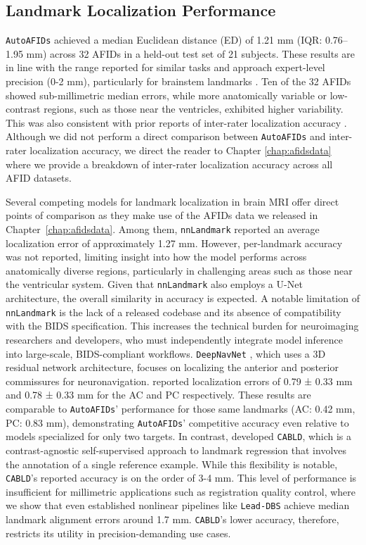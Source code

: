 \subsection{Landmark Localization Performance}

\texttt{AutoAFIDs} achieved a median Euclidean distance (ED) of 1.21 mm (IQR: 0.76–1.95 mm) across 32 AFIDs in a held-out test set of 21 subjects. These results are in line with the range reported for similar tasks \cite{Ertl2025-wu, Salari2024-iu, Edwards2021-su} and approach expert-level precision (0-2 mm), particularly for brainstem landmarks \cite{Abbass2022-lf}. Ten of the 32 AFIDs showed sub-millimetric median errors, while more anatomically variable or low-contrast regions, such as those near the ventricles, exhibited higher variability. This was also consistent with prior reports of inter-rater localization accuracy \cite{Lau2019-eh, Abbass2022-lf}. Although we did not perform a direct comparison between \texttt{AutoAFIDs} and inter-rater localization accuracy, we direct the reader to Chapter \ref{chap:afidsdata} where we provide a breakdown of inter-rater localization accuracy across all AFID datasets. 

Several competing models for landmark localization in brain MRI offer direct points of comparison as they make use of the AFIDs data we released in Chapter~\ref{chap:afidsdata}. Among them, \texttt{nnLandmark} \cite{Ertl2025-wu} reported an average localization error of approximately 1.27 mm. However, per-landmark accuracy was not reported, limiting insight into how the model performs across anatomically diverse regions, particularly in challenging areas such as those near the ventricular system. Given that \texttt{nnLandmark} also employs a U-Net architecture, the overall similarity in accuracy is expected. A notable limitation of \texttt{nnLandmark} is the lack of a released codebase and its absence of compatibility with the BIDS specification. This increases the technical burden for neuroimaging researchers and developers, who must independently integrate model inference into large-scale, BIDS-compliant workflows. \texttt{DeepNavNet} \cite{Edwards2021-su}, which uses a 3D residual network architecture, focuses on localizing the anterior and posterior commissures for neuronavigation. \cite{Edwards2021-su} reported localization errors of 0.79 ± 0.33 mm and 0.78 ± 0.33 mm for the AC and PC respectively. These results are comparable to \texttt{AutoAFIDs}’ performance for those same landmarks (AC: 0.42 mm, PC: 0.83 mm), demonstrating \texttt{AutoAFIDs}' competitive accuracy even relative to models specialized for only two targets. In contrast, \cite{Salari2024-iu} developed \texttt{CABLD}, which is a contrast-agnostic self-supervised approach to landmark regression that involves the annotation of a single reference example. While this flexibility is notable, \texttt{CABLD}'s reported accuracy is on the order of 3-4 mm. This level of performance is insufficient for millimetric applications such as registration quality control, where we show that even established nonlinear pipelines like \texttt{Lead-DBS} achieve median landmark alignment errors around 1.7 mm. \texttt{CABLD}’s lower accuracy, therefore, restricts its utility in precision-demanding use cases.

